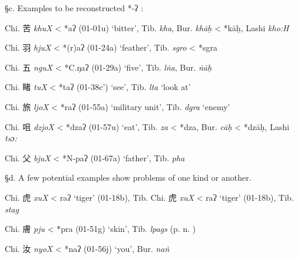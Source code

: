 §c. Examples to be reconstructed *-ʔ :

\begin{description} \item
Chi. 苦  \emph{khuX} \textless{} *{}{}aʔ (01-01u) `bitter', Tib. {} \emph{kha}, Bur. {} \emph{khāḥ} \textless{} *kāḥ, Lashi  \emph{kho:H}

\item
Chi. 羽  \emph{hjuX} \textless{} *{}(r)aʔ (01-24a) `feather', Tib. {} \emph{sgro} \textless{} *sg{}ra

\item
Chi. 五 \emph{nguX} \textless{} *C.ŋ{}aʔ (01-29a) `five', Tib. {} \emph{lṅa}, Bur. {} \emph{ṅāḥ}

\item
Chi. 睹  \emph{tuX} \textless{} *t{}aʔ (01-38c') `see', Tib. {} \emph{lta} `look at'

\item
Chi. 旅 \emph{ljoX} \textless{} *raʔ (01-55a) `military unit', Tib. {} \emph{dgra} `enemy'

\item
Chi. 咀  \emph{dzjoX} \textless{} *dzaʔ (01-57u) `eat', Tib. {} \emph{za}
\textless{} *dza, Bur. {} \emph{cāḥ} \textless{} *dzāḥ, Lashi
 \emph{tsɔ:}

\item
Chi. 父  \emph{bjuX} \textless{} *N-paʔ (01-67a) `father', Tib. {} \emph{pha}
\end{description}

§d. A few potential examples show problems of one kind or another.

\begin{description} \item
Chi. 虎  \emph{xuX} \textless{} {}{}raʔ `tiger' (01-18b), Tib.
\protect\hypertarget{anchor-59}{}{}Chi. 虎 \emph{xuX} \textless{}
{}{}raʔ `tiger' (01-18b), Tib. {} \emph{stag}

\item
Chi. 膚  \emph{pju} \textless{} *pra (01-51g) `skin', Tib. {} \emph{lpags }(p. n. )

\item
Chi. 汝  \emph{nyoX} \textless{} *naʔ (01-56j) `you', Bur. {} \emph{naṅ}
\end{description}

